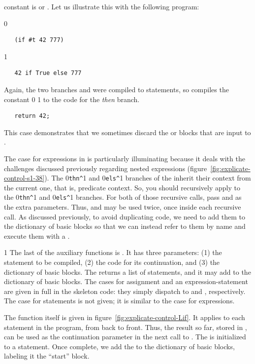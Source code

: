 \documentclass[7x10]{TimesAPriori_MIT}%
\def\racketEd{0}
\def\pythonEd{1}
\def\edition{1}
\newcommand{\racket}[1]{{\if\edition\racketEd{#1}\fi}}
\newcommand{\pythonColor}[0]{}
\newcommand{\python}[1]{{\if\edition\pythonEd\pythonColor #1\fi}}
\numberwithin{theorem}{chapter}
\numberwithin{definition}{chapter}
\numberwithin{equation}{chapter}
\begin{document}
constant is \TRUE{} or \FALSE{}. Let us illustrate this with the
following program:
{\if\edition\racketEd
\begin{lstlisting}
   (if #t 42 777)
\end{lstlisting}
\fi}
{\if\edition\pythonEd\pythonColor
\begin{lstlisting}
   42 if True else 777
\end{lstlisting}
\fi}
%
\noindent Again, the two branches  and  were
compiled to  statements, so 
compiles the constant \racket{} \python{} to the
code for the \emph{then} branch.
\begin{lstlisting}
   return 42;
\end{lstlisting}
This case demonstrates that we sometimes discard the  or
 blocks that are input to .

The case for  expressions in  is
particularly illuminating because it deals with the challenges
discussed previously regarding nested  expressions
(figure~\ref{fig:explicate-control-s1-38}).  The
\racket{\lstinline{thn^}}\python{} and
\racket{\lstinline{els^}}\python{} branches of the
 inherit their context from the current one, that is,
predicate context. So, you should recursively apply
 to the
\racket{\lstinline{thn^}}\python{} and
\racket{\lstinline{els^}}\python{} branches. For both of
those recursive calls, pass  and  as the extra
parameters. Thus,  and  may be used twice, once
inside each recursive call. As discussed previously, to avoid
duplicating code, we need to add them to the dictionary of basic
blocks so that we can instead refer to them by name and execute them
with a .

{\if\edition\pythonEd\pythonColor
%
The last of the auxiliary functions is .  It has
three parameters: (1) the statement to be compiled, (2) the code for its
continuation, and (3) the dictionary of basic blocks. The
 returns a list of statements, and it may add to
the dictionary of basic blocks. The cases for assignment and an
expression-statement are given in full in the skeleton code: they
simply dispatch to  and
, respectively. The case for 
statements is not given; it is similar to the case for 
expressions.

The  function itself is given in
figure~\ref{fig:explicate-control-Lif}. It applies
 to each statement in the program, from back to
front. Thus, the result so far, stored in , can be
used as the continuation parameter in the next call to
. The  is initialized to a
 statement. Once complete, we add the  to
the dictionary of basic blocks, labeling it the ``start'' block.
%
\fi}
\end{document}
